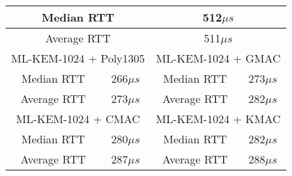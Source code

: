 \documentclass[floatrow,journal=tches,submission]{iacrtrans}
\newcommand{\us}{\mu s}
\begin{document}
\begin{table}[H]
\begin{tabular}{|c|c|c|c|}
        \multicolumn{2}{|c|}{Median RTT}
        & \multicolumn{2}{|c|}{512$\us$} \\
        \hline
        \multicolumn{2}{|c|}{Average RTT}
        & \multicolumn{2}{|c|}{511$\us$} \\
        \hline\hline
        \multicolumn{2}{|c|}{ML-KEM-1024 + Poly1305}
        & \multicolumn{2}{|c|}{ML-KEM-1024 + GMAC} \\
        \hline
        Median RTT & 266$\us$ & Median RTT & 273$\us$ \\
        \hline
        Average RTT & 273$\us$ & Average RTT & 282$\us$ \\
        \hline\hline
        \multicolumn{2}{|c|}{ML-KEM-1024 + CMAC}
        & \multicolumn{2}{|c|}{ML-KEM-1024 + KMAC} \\
        \hline
        Median RTT & 280$\us$ & Median RTT & 282$\us$ \\
        \hline
        Average RTT & 287$\us$ & Average RTT & 288$\us$ \\
        \hline
    \end{tabular}
\end{table}
\end{document}
